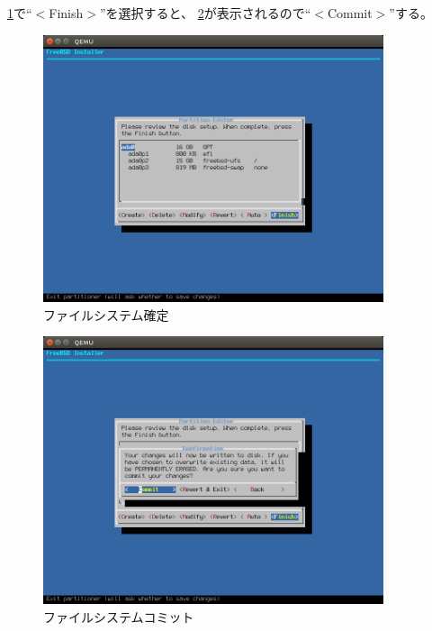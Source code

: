 \documentclass[a4j]{jarticle}
\begin{document}
\begin{multicols}{2}
\ref{fig:FreeBSD_FileSYstem_fin}で``$<$Finish$>$''を選択すると、
\ref{fig:FreeBSD_FileSYstem_com}が表示されるので``$<$Commit$>$''する。
\begin{figure}[htbp]
	\begin{center}
    	\includegraphics[width=10cm]{./IMG/FreeBSD_PT_FIX.png}
	\end{center}
    \caption{ファイルシステム確定}
    \label{fig:FreeBSD_FileSYstem_fin}
\end{figure}
\begin{figure}[htbp]
	\begin{center}
    	\includegraphics[width=10cm]{./IMG/FreeBSD_COMMIT.png}
	\end{center}
    \caption{ファイルシステムコミット}
    \label{fig:FreeBSD_FileSYstem_com}
\end{figure}


\end{multicols}
\end{document}

